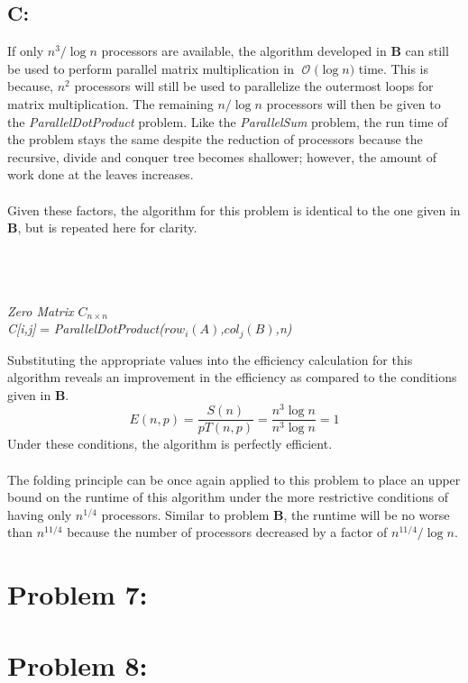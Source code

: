 \documentclass[12pt]{article}
\newcommand{\BigO}[1]{\ensuremath{\operatorname{\mathcal{O}}\bigl(#1\bigr)}}
\begin{document}
\subsection*{C:}
If only $n^3 / \log n$ processors are available, the algorithm
developed in \textbf{B} can still be used to perform parallel matrix
multiplication in \BigO{\log n} time.  This is because, $n^2$ processors
will still be used to parallelize the outermost loops for matrix
multiplication.  The remaining $n/\log n$ processors will then be
given to the \textit{ParallelDotProduct} problem.  Like the 
\textit{ParallelSum} problem, the run time of the problem stays the
same despite the reduction of processors because the recursive,
divide and conquer tree becomes shallower; however, the amount of 
work done at the leaves increases.\\\\
Given these factors, the algorithm for this problem is identical to
the one given in \textbf{B}, but is repeated here for clarity.\\\\
\begin{algorithm}[H]
\\
\\
\textit{Zero Matrix $C_{n\times n}$}\\
{
{
   \textit{C[i,j]} = \textit{ParallelDotProduct($row_i(A)$,$col_j(B)$,n)}\\ 
}
}
\end{algorithm}
Substituting the appropriate values into the efficiency calculation
for this algorithm reveals an improvement in the efficiency as 
compared to the conditions given in \textbf{B}.
\[
    E(n,p) = \frac{S(n)}{pT(n,p)} = \frac{n^3 \log n}{n^3 \log n} = 1 
\]
Under these conditions, the algorithm is perfectly efficient.\\\\
The folding principle can be once again applied to this problem to
place an upper bound on the runtime of this algorithm under the more
restrictive conditions of having only $n^{1/4}$ processors. Similar to 
problem \textbf{B}, the runtime will be no worse than $n^{11/4}$ because        
the number of processors decreased by a factor of $n^{11/4}/ \log n$.
\section*{Problem 7: }
\section*{Problem 8: }
\end{document}
